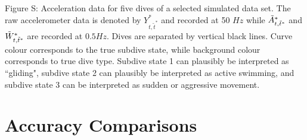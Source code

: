 \documentclass{article}
\begin{document}
    	\noindent Figure S: Acceleration data for five dives of a selected simulated data set. The raw accelerometer data is denoted by $Y^*_{t,\tilde t^*}$ and recorded at 50 $Hz$ while $\tilde{A}^*_{t,\tilde t^*}$ and $\tilde{W}^*_{t,\tilde t^*}$ are recorded at $0.5 Hz$. Dives are separated by vertical black lines. Curve colour corresponds to the true subdive state, while background colour corresponds to true dive type. Subdive state 1 can plausibly be interpreted as ``gliding", subdive state 2 can plausibly be interpreted as active swimming, and subdive state 3 can be interpreted as sudden or aggressive movement.
    	\addtocounter{fignum}{1}

    \newpage
    \section{Accuracy Comparisons}
        
\end{document}
